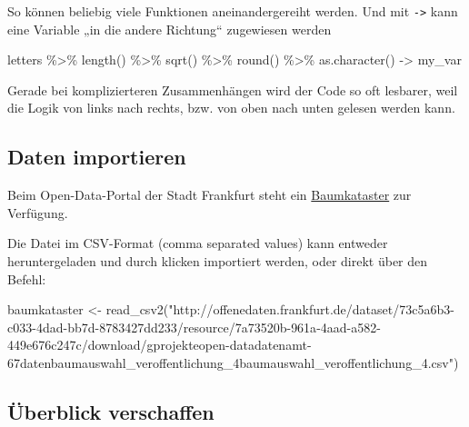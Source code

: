 \documentclass[
  ngerman,
]{article}
\newenvironment{Shaded}{\begin{snugshade}}{\end{snugshade}}
\newcommand{\FunctionTok}[1]{\textcolor[rgb]{0.00,0.00,0.00}{#1}}
\newcommand{\NormalTok}[1]{#1}
\newcommand{\OtherTok}[1]{\textcolor[rgb]{0.56,0.35,0.01}{#1}}
\newcommand{\SpecialCharTok}[1]{\textcolor[rgb]{0.00,0.00,0.00}{#1}}
\newcommand{\StringTok}[1]{\textcolor[rgb]{0.31,0.60,0.02}{#1}}
\begin{document}
So können beliebig viele Funktionen aneinandergereiht werden. Und mit \texttt{-\textgreater{}} kann eine Variable „in die andere Richtung`` zugewiesen werden

\begin{Shaded}
\begin{Highlighting}[]
\NormalTok{letters }\SpecialCharTok{\%\textgreater{}\%}
  \FunctionTok{length}\NormalTok{() }\SpecialCharTok{\%\textgreater{}\%}
  \FunctionTok{sqrt}\NormalTok{() }\SpecialCharTok{\%\textgreater{}\%}
  \FunctionTok{round}\NormalTok{() }\SpecialCharTok{\%\textgreater{}\%}
  \FunctionTok{as.character}\NormalTok{() }\OtherTok{{-}\textgreater{}}
\NormalTok{  my\_var}
\end{Highlighting}
\end{Shaded}

Gerade bei komplizierteren Zusammenhängen wird der Code so oft lesbarer, weil die Logik von links nach rechts, bzw. von oben nach unten gelesen werden kann.

\hypertarget{daten-importieren}{%
\subsection{Daten importieren}\label{daten-importieren}}

Beim Open-Data-Portal der Stadt Frankfurt steht ein \href{http://offenedaten.frankfurt.de/dataset/baumkataster-frankfurt-am-main}{Baumkataster} zur Verfügung.

Die Datei im CSV-Format (comma separated values) kann entweder heruntergeladen und durch klicken importiert werden, oder direkt über den Befehl:

\begin{Shaded}
\begin{Highlighting}[]
\NormalTok{baumkataster }\OtherTok{\textless{}{-}} \FunctionTok{read\_csv2}\NormalTok{(}\StringTok{"http://offenedaten.frankfurt.de/dataset/73c5a6b3{-}c033{-}4dad{-}bb7d{-}8783427dd233/resource/7a73520b{-}961a{-}4aad{-}a582{-}449e676c247c/download/gprojekteopen{-}datadatenamt{-}67datenbaumauswahl\_veroffentlichung\_4baumauswahl\_veroffentlichung\_4.csv"}\NormalTok{)}
\end{Highlighting}
\end{Shaded}

\hypertarget{uxfcberblick-verschaffen}{%
\subsection{Überblick verschaffen}\label{uxfcberblick-verschaffen}}
\end{document}
